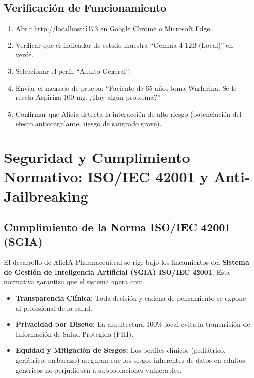 \documentclass[12pt,a4paper]{article}
\begin{document}
\subsection{Verificación de Funcionamiento}

\begin{enumerate}
  \item Abrir \url{http://localhost:5173} en Google Chrome o Microsoft Edge.
  \item Verificar que el indicador de estado muestra ``Gemma 4 12B (Local)'' en verde.
  \item Seleccionar el perfil ``Adulto General''.
  \item Enviar el mensaje de prueba: ``Paciente de 65 años toma Warfarina. Se le receta
    Aspirina 100 mg. ¿Hay algún problema?''
  \item Confirmar que Alicia detecta la interacción de alto riesgo (potenciación del efecto
    anticoagulante, riesgo de sangrado grave).
\end{enumerate}

\newpage

\section{Seguridad y Cumplimiento Normativo: ISO/IEC 42001 y Anti-Jailbreaking}

\subsection{Cumplimiento de la Norma ISO/IEC 42001 (SGIA)}
El desarrollo de AlicIA Pharmaceutical se rige bajo los lineamientos del \textbf{Sistema de Gestión de Inteligencia Artificial (SGIA) ISO/IEC 42001}. Esta normativa garantiza que el sistema opera con:
\begin{itemize}
  \item \textbf{Transparencia Clínica:} Toda decisión y cadena de pensamiento se expone al profesional de la salud.
  \item \textbf{Privacidad por Diseño:} La arquitectura 100\% local evita la transmisión de Información de Salud Protegida (PHI).
  \item \textbf{Equidad y Mitigación de Sesgos:} Los perfiles clínicos (pediátrico, geriátrico, embarazo) aseguran que los sesgos inherentes de datos en adultos genéricos no perjudiquen a subpoblaciones vulnerables.
\end{itemize}
\end{document}
